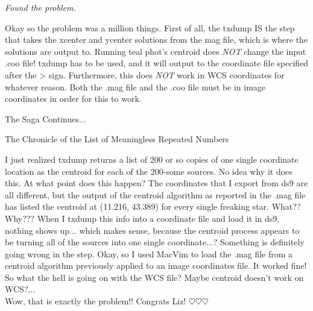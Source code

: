 \documentclass[11pt,obeyspaces]{article} %
\begin{document}
\begin{oframed}
\centerline{\it Found the problem.} 

Okay so the problem was a million things. First of all, the txdump IS the step that takes the xcenter and ycenter solutions from the mag file, which is where the solutions are output to. Running teal phot's centroid does {\it NOT} change the input .coo file! txdump has to be used, and it will output to the coordinate file specified after the > sign. Furthermore, this does {\it NOT} work in WCS coordinates for whatever reason. Both the .mag file and the .coo file must be in image coordinates in order for this to work. \\

\centerline{\sc The Saga Continues...}
\end{oframed}

\begin{oframed}
\centerline{\sc The Chronicle of the List of Meaningless Repeated Numbers}
I just realized txdump returns a list of 200 or so copies of one single coordinate location as the centroid for each of the 200-some sources. No idea why it does this. At what point does this happen? The coordinates that I export from ds9 are all different, but the output of the centroid algorithm as reported in the .mag file has listed the centroid at (11.216, 43.389) for every single freaking star. What?? Why??? When I txdump this info into a coordinate file and load it in ds9, nothing shows up... which makes sense, because the centroid process appears to be turning all of the sources into one single coordinate...? Something is definitely going wrong in the  step. Okay, so I used MacVim to load the .mag file from a centroid algorithm previously applied to an image coordinates file. It worked fine! So what the hell is going on with the WCS file? Maybe centroid doesn't work on WCS?... \\
Wow, that is exactly the problem!! Congrats Liz! $\heartsuit \heartsuit \heartsuit$
\end{oframed}
\end{document}
